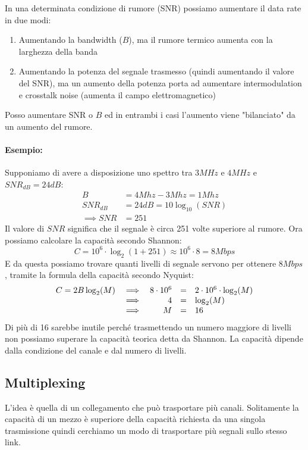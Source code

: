 In una determinata condizione di rumore (SNR) possiamo aumentare il data rate in due modi:
\begin{enumerate}
	\item Aumentando la bandwidth ($B$), ma il rumore termico aumenta con la larghezza della banda
	\item Aumentando la potenza del segnale trasmesso (quindi aumentando il valore del SNR), ma un aumento della potenza porta ad aumentare intermodulation e crosstalk noise (aumenta il campo elettromagnetico)
\end{enumerate}
Posso aumentare SNR o $B$ ed in entrambi i casi l'aumento viene "bilanciato" da un aumento del rumore.\\

\newpage

\paragraph{Esempio:} Supponiamo di avere a disposizione uno spettro tra $3 MHz$ e $4 MHz$ e $SNR_{dB}=24dB$:
\begin{align*}
	B & = 4Mhz - 3Mhz = 1 Mhz \\
	SNR_{dB} & = 24dB = 10 \log_{10} (SNR) \\
	\implies SNR & = 251
\end{align*}
Il valore di $SNR$ significa che il segnale è circa 251 volte superiore al rumore. Ora possiamo calcolare la capacità secondo Shannon:
$$ C = 10^6 \cdot \log_2 (1 + 251) \approx 10^6 \cdot 8 = 8 Mbps $$
E da questa possiamo trovare quanti livelli di segnale servono per ottenere $8Mbps$, tramite la formula della capacità secondo Nyquist:
$$\begin{array}{c c r c l}
	C = 2B \log_2 (M) & \implies & 8 \cdot 10^6 &=& 2 \cdot 10^6 \cdot \log_2(M) \\
	& \implies & 4 &=& \log_2 (M)  \\
	& \implies & M &=& 16 \\
\end{array}$$
Di più di 16 sarebbe inutile perché trasmettendo un numero maggiore di livelli non possiamo superare la capacità teorica detta da Shannon. La capacità dipende dalla condizione del canale e dal numero di livelli.\\

\newpage

\subsection{Multiplexing}
L'idea è quella di un collegamento che può trasportare più canali. Solitamente la capacità di un mezzo è superiore della capacità richiesta da una singola trasmissione quindi cerchiamo un modo di trasportare più segnali sullo stesso link.

